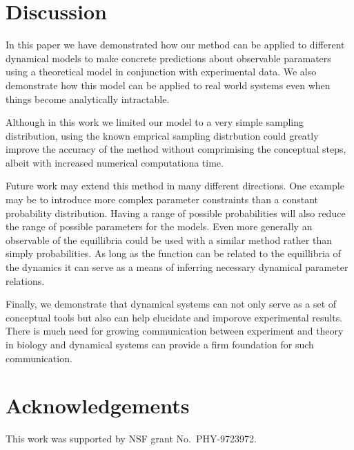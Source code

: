 \documentclass[letterpaper]{article}
\begin{document}
\section{Discussion}
In this paper we have demonstrated how our method can be applied to different
dynamical models to make concrete predictions about observable paramaters using 
a theoretical model in conjunction with experimental data. We also demonstrate
how this model can be applied to real world systems even when things become 
analytically intractable.

Although in this work we limited our model to a very simple sampling distribution,
using the known emprical sampling distrbution could greatly improve the accuracy of
the method without comprimising the conceptual steps, albeit with increased numerical
computationa time.

Future work may extend this method in many different directions. One example may 
be to introduce more complex parameter constraints than a constant probability
distribution. Having a range of possible probabilities will also reduce the
range of possible parameters for the models. Even more generally an observable
of the equillibria could be used with a similar method rather than simply
probabilities. As long as the function can be related to the equillibria of the
dynamics it can serve as a means of inferring necessary dynamical parameter relations.

Finally, we demonstrate that dynamical systems can not only serve as a set of conceptual
tools but also can help elucidate and imporove experimental results. There is much need
for growing communication between experiment and theory in biology and dynamical systems
can provide a firm foundation for such communication.
\section{Acknowledgements}

This work was supported by NSF grant No.\ PHY-9723972.

\footnotesize

\end{document}
